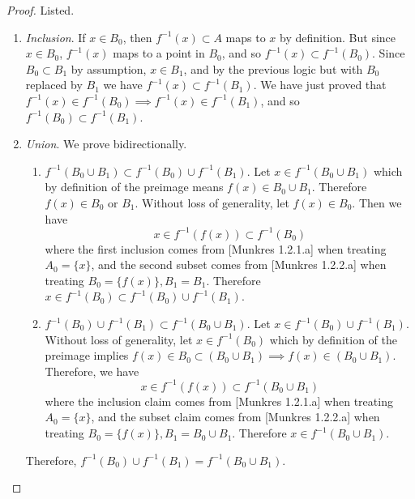   \begin{proof}
    Listed. 
    \begin{enumerate}
      \item \textit{Inclusion}. If $x \in B_0$, then $f^{-1} (x) \subset A$ maps to $x$ by definition. But since $x \in B_0$, $f^{-1} (x)$ maps to a point in $B_0$, and so $f^{-1} (x) \subset f^{-1} (B_0)$. Since $B_0 \subset B_1$ by assumption, $x \in B_1$, and by the previous logic but with $B_0$ replaced by $B_1$ we have $f^{-1}(x) \subset f^{-1} (B_1)$. We have just proved that $f^{-1} (x) \in f^{-1} (B_0)  \implies f^{-1} (x) \in f^{-1} (B_1)$, and so $f^{-1} (B_0) \subset f^{-1} (B_1)$. 

      \item \textit{Union}. We prove bidirectionally. 
      \begin{enumerate}
        \item $f^{-1} (B_0 \cup B_1) \subset f^{-1} (B_0) \cup f^{-1} (B_1)$. Let $x \in f^{-1} (B_0 \cup B_1)$ which by definition of the preimage means $f(x) \in B_0 \cup B_1$. Therefore $f(x) \in B_0$ or $B_1$. Without loss of generality, let $f(x) \in B_0$. Then we have 
          \begin{equation}
            x \in f^{-1} (f(x)) \subset f^{-1} (B_0)
          \end{equation} 
          where the first inclusion comes from [Munkres 1.2.1.a] when treating $A_0 = \{x\}$, and the second subset comes from [Munkres 1.2.2.a] when treating $B_0 = \{f(x)\}, B_1 = B_1$. Therefore $x \in f^{-1} (B_0) \subset f^{-1} (B_0) \cup f^{-1} (B_1)$. 
        \item $f^{-1} (B_0) \cup f^{-1} (B_1) \subset f^{-1} (B_0 \cup B_1)$. Let $x \in f^{-1}(B_0) \cup f^{-1} (B_1)$. Without loss of generality, let $x \in f^{-1}(B_0)$ which by definition of the preimage implies $f(x) \in B_0 \subset (B_0 \cup B_1) \implies f(x) \in (B_0 \cup B_1)$. Therefore, we have 
          \begin{equation}
            x \in f^{-1} (f(x)) \subset f^{-1} (B_0 \cup B_1)
          \end{equation} 
          where the inclusion claim comes from [Munkres 1.2.1.a] when treating $A_0 = \{x\}$, and the subset claim comes from [Munkres 1.2.2.a] when treating $B_0 = \{f(x)\}, B_1 = B_0 \cup B_1$. Therefore $x \in f^{-1} (B_0 \cup B_1)$. 
      \end{enumerate}
      Therefore, $f^{-1} (B_0) \cup f^{-1} (B_1) = f^{-1} (B_0 \cup B_1)$. 


\end{enumerate}
\end{proof}

